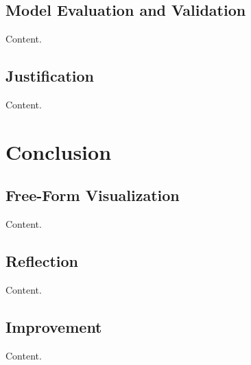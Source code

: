\documentclass{article}
\begin{document}
\subsection{Model Evaluation and Validation}

Content.

\subsection{Justification}

Content.

\section{Conclusion}

\subsection{Free-Form Visualization}

Content.

\subsection{Reflection}

Content.

\subsection{Improvement}

Content.




\end{document}
